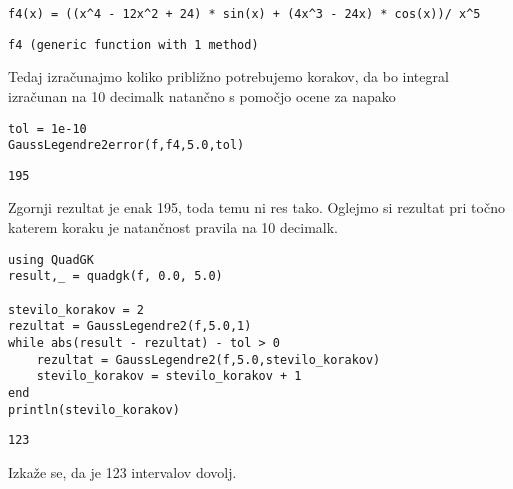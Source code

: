 \documentclass[12pt,a4paper]{article}
\begin{document}
\begin{verbatim}
f4(x) = ((x^4 - 12x^2 + 24) * sin(x) + (4x^3 - 24x) * cos(x))/ x^5
\end{verbatim}
\begin{verbatim}
f4 (generic function with 1 method)
\end{verbatim}

Tedaj izračunajmo koliko približno potrebujemo korakov, da bo integral izračunan na 10 decimalk natančno s pomočjo ocene za napako


\begin{verbatim}
tol = 1e-10
GaussLegendre2error(f,f4,5.0,tol)
\end{verbatim}
\begin{verbatim}
195
\end{verbatim}

Zgornji rezultat je enak 195, toda temu ni res tako. Oglejmo si rezultat pri točno katerem koraku je natančnost pravila na 10 decimalk.


\begin{verbatim}
using QuadGK
result,_ = quadgk(f, 0.0, 5.0)

stevilo_korakov = 2
rezultat = GaussLegendre2(f,5.0,1)
while abs(result - rezultat) - tol > 0
    rezultat = GaussLegendre2(f,5.0,stevilo_korakov)
    stevilo_korakov = stevilo_korakov + 1
end
println(stevilo_korakov)
\end{verbatim}
\begin{verbatim}
123
\end{verbatim}

Izkaže se, da je 123 intervalov dovolj.


\begin{verbatim}
\end{verbatim}
\end{document}
